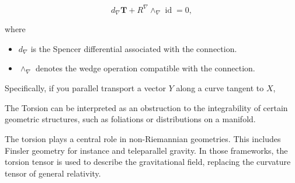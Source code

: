 \begin{equation}
    d_{\nabla} \boldsymbol{T} + R^\nabla \wedge_{\nabla} \operatorname{id} = 0,
\end{equation}

where \begin{itemize}
    \item $d_\nabla$ is the Spencer differential associated with the connection.
    \item $\wedge_{\nabla}$ denotes the wedge operation compatible with the connection.
\end{itemize}


Specifically, if you parallel transport a vector $Y$ along a curve tangent to $X$, 
\begin{example}
The Torsion can be interpreted as an obstruction to the integrability of certain geometric structures,
such as foliations or distributions on a manifold.
\end{example}
\begin{example}
The torsion plays a central role in non-Riemannian geometries. This includes Finsler geometry for instance and 
teleparallel gravity. In those frameworks, the torsion tensor is used to describe the gravitational field, 
replacing the curvature tensor of general relativity.
\end{example}